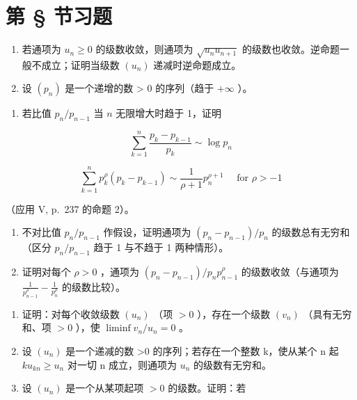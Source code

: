 \setcounter{exercisegroup}{3}
\section*{第 \S{} 节习题}
{}

\begin{enumerate}
\def\labelenumi{\arabic{enumi})}
\item
  若通项为 \(u_{n} \geqslant 0\) 的级数收敛，则通项为 \(\sqrt{u_n u_{n+1}}\) 的级数也收敛。逆命题一般不成立；证明当级数 \((u_n)\) 递减时逆命题成立。
\item
  设 \((p_{n})\) 是一个递增的数 \textgreater{} 0 的序列（趋于 \(+\infty\) ）。
\end{enumerate}

\begin{enumerate}
\def\labelenumi{\alph{enumi})}
\tightlist
\item
  若比值 \(p_n / p_{n-1}\) 当 \(n\) 无限增大时趋于 1，证明
\end{enumerate}

\[
\sum_ {k = 1} ^ {n} \frac {p _ {k} - p _ {k - 1}}{p _ {k}} \sim \log p _ {n}
\]

\[
\sum_ {k = 1} ^ {n} p _ {k} ^ {\rho} (p _ {k} - p _ {k - 1}) \sim \frac {1}{\rho + 1} p _ {n} ^ {\rho + 1} \quad \text { for } \rho > - 1
\]

（应用 V, p.~237 的命题 2）。

\begin{enumerate}
\def\labelenumi{\alph{enumi})}
\setcounter{enumi}{1}
\item
  不对比值 \(p_{n}/p_{n-1}\) 作假设，证明通项为 \((p_{n}-p_{n-1})/p_{n}\) 的级数总有无穷和（区分 \(p_{n}/p_{n-1}\) 趋于 1 与不趋于 1 两种情形）。
\item
  证明对每个 \(\rho > 0\) ，通项为 \((p_n - p_{n-1}) / p_n p_{n-1}^\rho\) 的级数收敛（与通项为 \(\frac{1}{p_{n-1}^\rho} - \frac{1}{p_n^\rho}\) 的级数比较）。
\end{enumerate}

\begin{enumerate}
\def\labelenumi{\arabic{enumi})}
\setcounter{enumi}{2}
\item
  证明：对每个收敛级数 \((u_{n})\) （项 \(>0\) ），存在一个级数 \((v_{n})\) （具有无穷和、项 \(>0\) ），使 \(\liminf v_n / u_n = 0\) 。
\item
  设 \((u_{n})\) 是一个递减的数 \textgreater0 的序列；若存在一个整数 k，使从某个 n 起 \(ku_{kn} \geqslant u_{n}\) 对一切 n 成立，则通项为 \(u_{n}\) 的级数有无穷和。
\item
  设 \((u_{n})\) 是一个从某项起项 \(>0\) 的级数。证明：若
\end{enumerate}

